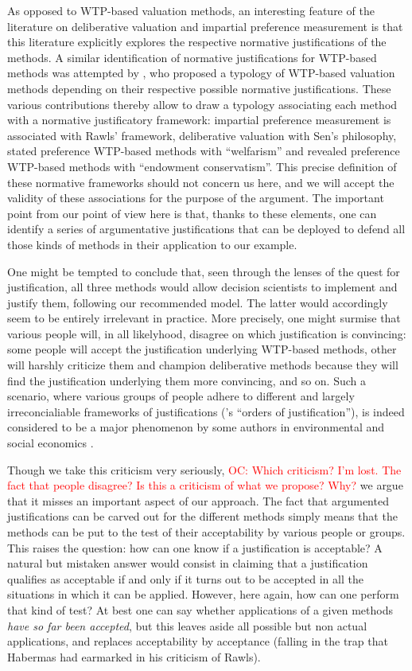 \documentclass[preprint, french, english, 11pt]{elsarticle}%
\newcommand{\commentOC}[1]{\textcolor{red}{OC: #1}}
\begin{document}
As opposed to WTP-based valuation methods, an interesting feature of the literature on deliberative valuation and impartial preference measurement is that this literature explicitly explores the respective normative justifications of the methods. A similar identification of normative justifications for WTP-based methods was attempted by \citep{meinard_ethical_2016}, who proposed a typology of WTP-based valuation methods depending on their respective possible normative justifications. These various contributions thereby allow to draw a typology associating each method with a normative justificatory framework: impartial preference measurement is associated with Rawls' framework, deliberative valuation with Sen's philosophy, stated preference WTP-based methods with ``welfarism'' and revealed preference WTP-based methods with ``endowment conservatism''. This precise definition of these normative frameworks should not concern us here, and we will accept the validity of these associations for the purpose of the argument. The important point from our point of view here is that, thanks to these elements, one can identify a series of argumentative justifications that can be deployed to defend all those kinds of methods in their application to our example.

One might be tempted to conclude that, seen through the lenses of the quest for justification, all three methods would allow decision scientists to implement and justify them, following our recommended model. The latter would accordingly seem to be entirely irrelevant in practice. More precisely, one might surmise that various people will, in all likelyhood, disagree on which justification is convincing: some people will accept the justification underlying WTP-based methods, other will harshly criticize them and champion deliberative methods because they will find the justification underlying them more convincing, and so on. Such a scenario, where various groups of people adhere to different and largely irreconcialiable frameworks of justifications (\citep{boltanski_justification_2006}'s ``orders of justification''), is indeed considered to be a major phenomenon by some authors in environmental and social economics \citep{chateauraynaud_contrainte_2007}.

Though we take this criticism very seriously, 
\commentOC{Which criticism? I’m lost. The fact that people disagree? Is this a criticism of what we propose? Why?}
we argue that it misses an important aspect of our approach. The fact that argumented justifications can be carved out for the different methods simply means that the methods can be put to the test of their acceptability by various people or groups. This raises the question: how can one know if a justification is acceptable? A natural but mistaken answer would consist in claiming that a justification qualifies as acceptable if and only if it turns out to be accepted in all the situations in which it can be applied. However, here again, how can one perform that kind of test? At best one can say whether applications of a given methods \emph{have so far been accepted}, but this leaves aside all possible but non actual applications, and replaces acceptability by acceptance (falling in the trap that Habermas had earmarked in his criticism of Rawls).
\end{document}
